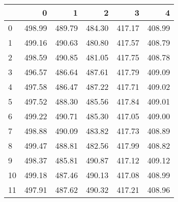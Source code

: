 \begin{tabular}{lrrrrr}
\toprule
{} &       0 &       1 &       2 &       3 &       4 \\
\midrule
0  &  498.99 &  489.79 &  484.30 &  417.17 &  408.99 \\
1  &  499.16 &  490.63 &  480.80 &  417.57 &  408.79 \\
2  &  498.59 &  490.85 &  481.05 &  417.75 &  408.78 \\
3  &  496.57 &  486.64 &  487.61 &  417.79 &  409.09 \\
4  &  497.58 &  486.47 &  487.22 &  417.71 &  409.02 \\
5  &  497.52 &  488.30 &  485.56 &  417.84 &  409.01 \\
6  &  499.22 &  490.71 &  485.30 &  417.05 &  409.00 \\
7  &  498.88 &  490.09 &  483.82 &  417.73 &  408.89 \\
8  &  499.47 &  488.81 &  482.56 &  417.99 &  408.82 \\
9  &  498.37 &  485.81 &  490.87 &  417.12 &  409.12 \\
10 &  499.18 &  487.46 &  490.13 &  417.08 &  408.99 \\
11 &  497.91 &  487.62 &  490.32 &  417.21 &  408.96 \\
\bottomrule
\end{tabular}
